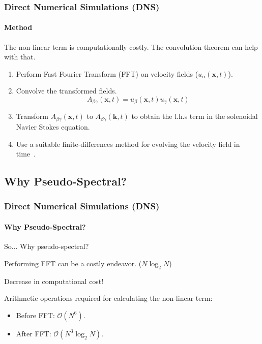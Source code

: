 \documentclass{beamer}
\begin{document}
\begin{frame}
 \frametitle{Direct Numerical Simulations (DNS)}
 \framesubtitle{Method}
 
 The non-linear term is computationally costly. The convolution theorem can help with that.
 
 \begin{enumerate}
  \item Perform Fast Fourier Transform (FFT) on velocity fields ($u_\alpha (\bm x, t)$). %
  \item<2-> Convolve the transformed fields. \begin{equation}
                                              A_{\beta \gamma} (\bm x, t) = u_\beta (\bm x, t) u_\gamma (\bm x, t)
                                             \end{equation}
  \item<3-> Transform $A_{\beta \gamma} (\bm x, t)$ to $A_{\beta \gamma} (\bm k, t)$ to obtain the l.h.s term in the solenoidal Navier Stokes equation.
  \item<4-> Use a suitable finite-differences method for evolving the velocity field in time~\cite{mccomb1990physics}. 
 \end{enumerate}

\end{frame}

\subsection{Why Pseudo-Spectral?}

\begin{frame}
 \frametitle{Direct Numerical Simulations (DNS)}
 \framesubtitle{Why Pseudo-Spectral?}
 
 So... Why pseudo-spectral? \pause
 
 Performing FFT can be a costly endeavor. ($N \log_2 N$) \pause
 \vspace{1cm}
 
 {\color{red}Decrease in computational cost!} \pause
 
 Arithmetic operations required for calculating the non-linear term:
 \begin{itemize}
  \item Before FFT: $\mathcal O (N^6)$.
  \item<5-> After FFT: $\mathcal O (N^3 \log_2 N)$.
 \end{itemize}

\end{frame}
\end{document}
